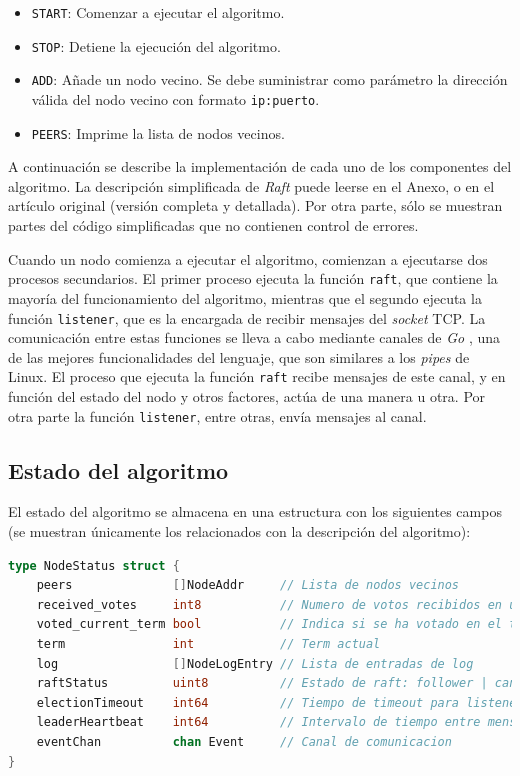 \newpage

\begin{itemize}
\item\texttt{START}: Comenzar a ejecutar el algoritmo.
\item\texttt{STOP}: Detiene la ejecución del algoritmo.
\item\texttt{ADD}: Añade un nodo vecino. Se debe suministrar como parámetro la dirección válida del nodo vecino con formato \texttt{ip:puerto}.
\item\texttt{PEERS}: Imprime la lista de nodos vecinos.
\end{itemize}

A continuación se describe la implementación de cada uno de los componentes del algoritmo. La descripción simplificada de \textit{Raft} puede leerse en el Anexo, o en el artículo original \cite{raft1} (versión completa y detallada). Por otra parte, sólo se muestran partes del código simplificadas que no contienen control de errores.

Cuando un nodo comienza a ejecutar el algoritmo, comienzan a ejecutarse dos procesos secundarios. El primer proceso ejecuta la función \texttt{raft}, que contiene la mayoría del funcionamiento del algoritmo, mientras que el segundo ejecuta la función \texttt{listener}, que es la encargada de recibir mensajes del \textit{socket} TCP. La comunicación entre estas funciones se lleva a cabo mediante canales de \textit{Go} \cite{gochannels}, una de las mejores funcionalidades del lenguaje, que son similares a los \textit{pipes} de Linux. El proceso que ejecuta la función \texttt{raft} recibe mensajes de este canal, y en función del estado del nodo y otros factores, actúa de una manera u otra. Por otra parte la función \texttt{listener}, entre otras, envía mensajes al canal.

\subsection{Estado del algoritmo}

El estado del algoritmo se almacena en una estructura con los siguientes campos (se muestran únicamente los relacionados con la descripción del algoritmo):

\begin{lstlisting}[language=go]
type NodeStatus struct {
	peers              []NodeAddr     // Lista de nodos vecinos
	received_votes     int8           // Numero de votos recibidos en una eleccion
	voted_current_term bool           // Indica si se ha votado en el term acutal
	term               int            // Term actual
	log                []NodeLogEntry // Lista de entradas de log
	raftStatus         uint8          // Estado de raft: follower | candidate | leader
	electionTimeout    int64          // Tiempo de timeout para listener()
	leaderHeartbeat    int64          // Intervalo de tiempo entre mensajes para leaderHeartbeats()
	eventChan          chan Event     // Canal de comunicacion
}
\end{lstlisting}

